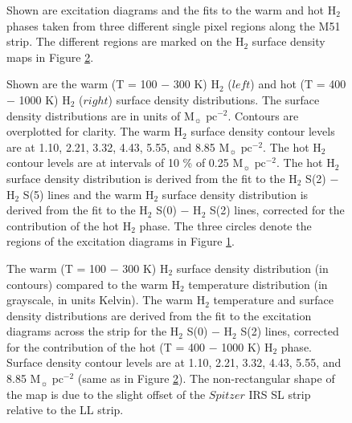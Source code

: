 \documentclass[manuscript]{aastex}
\begin{document}
\clearpage

\begin{figure}
\caption{Shown are excitation diagrams and the fits to the warm
and hot H$_2$ phases taken from three different single pixel regions along the M51 strip. 
The different regions are marked on the H$_2$ surface density maps 
in Figure \ref{figure-4}.}
\label{figure-3}
\end{figure}

\clearpage

\begin{figure}
\caption{Shown are the warm (T = 100 $-$ 300 K) 
H$_2$ ($left$) and hot (T = 400 $-$ 1000 K) 
H$_2$ ($right$) surface density distributions.  The surface density
 distributions are in units of $\mathrm{M_\sun}$ 
$\mathrm{pc^{-2}}$.   Contours are overplotted for clarity.  
The warm H$_2$ surface density contour levels are at 
1.10, 2.21, 3.32, 4.43, 5.55, and 8.85 $\mathrm{M_\sun}$ $\mathrm{pc^{-2}}$.  
The hot H$_2$ contour 
levels are at intervals of 10 \% of 0.25 $\mathrm{M_\sun}$ $\mathrm{pc^{-2}}$.  
The hot H$_2$ surface density distribution is derived 
from the fit to the H$_2$ S(2) $-$ 
H$_2$ S(5) lines and the warm H$_2$ 
surface density distribution is derived from the fit to the 
H$_2$ S(0) $-$ H$_2$ S(2) lines, 
corrected for the contribution of the hot H$_2$ phase.
The three circles denote the regions of the excitation diagrams in Figure \ref{figure-3}.}
\label{figure-4}
\end{figure}

\clearpage

\begin{figure}
\caption{The warm (T = 100 $-$ 300 K) H$_2$ surface 
density distribution (in contours) compared 
to the warm H$_2$ temperature distribution 
(in grayscale, in units Kelvin).  The warm H$_2$ 
temperature and surface density distributions are derived from the fit to the excitation 
diagrams across the strip for the H$_2$ S(0) $-$ H$_2$ S(2) lines, 
corrected for the contribution of the hot (T = 400 $-$ 1000 K) H$_2$ phase.  
Surface density contour levels are at 
1.10, 2.21, 3.32, 4.43, 5.55, and 8.85 $\mathrm{M_\sun}$ $\mathrm{pc^{-2}}$ 
(same as in Figure \ref{figure-4}). The non-rectangular shape of the 
map is due to the slight offset of the $Spitzer$ IRS SL 
strip relative to the LL strip.}
\label{figure-5}
\end{figure}
\end{document}
